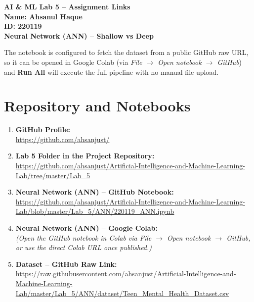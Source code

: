 \documentclass[11pt]{article}
\begin{document}
\begin{center}
    {\huge \textbf{AI \& ML Lab 5 -- Assignment Links}} \\[0.3cm]
    {\Large \textbf{Name: Ahsanul Haque}} \\[0.1cm]
    {\Large \textbf{ID: 220119}} \\[0.4cm]
    {\large \textbf{Neural Network (ANN) -- Shallow vs Deep}} \\[0.5cm]
\end{center}

\noindent The notebook is configured to fetch the dataset from a public GitHub raw URL,
so it can be opened in Google Colab (via \emph{File $\rightarrow$ Open notebook
$\rightarrow$ GitHub}) and \textbf{Run All} will execute the full pipeline with no
manual file upload.

\section*{Repository and Notebooks}

\begin{enumerate}[leftmargin=*, itemsep=0.3cm]

    \item \textbf{GitHub Profile:} \\
    \url{https://github.com/ahsanjust/}

    \item \textbf{Lab 5 Folder in the Project Repository:} \\
    \url{https://github.com/ahsanjust/Artificial-Intelligence-and-Machine-Learning-Lab/tree/master/Lab_5}

    \item \textbf{Neural Network (ANN) -- GitHub Notebook:} \\
    \url{https://github.com/ahsanjust/Artificial-Intelligence-and-Machine-Learning-Lab/blob/master/Lab_5/ANN/220119_ANN.ipynb}

    \item \textbf{Neural Network (ANN) -- Google Colab:} \\
    \emph{(Open the GitHub notebook in Colab via File $\rightarrow$ Open notebook $\rightarrow$ GitHub, or use the direct Colab URL once published.)}

    \item \textbf{Dataset -- GitHub Raw Link:} \\
    \url{https://raw.githubusercontent.com/ahsanjust/Artificial-Intelligence-and-Machine-Learning-Lab/master/Lab_5/ANN/dataset/Teen_Mental_Health_Dataset.csv}

\end{enumerate}
\end{document}
